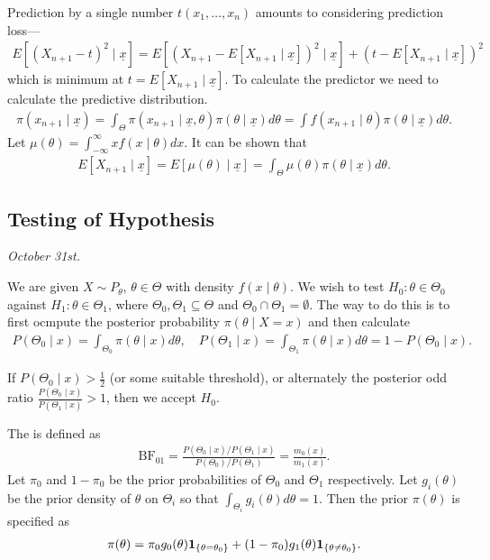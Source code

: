 Prediction by a single number $t(x_{1},\ldots,x_{n})$ amounts to considering prediction loss---
\begin{align}
    E[(X_{n+1}-t)^{2} \mid \underline{x}] = E[(X_{n+1}-E[X_{n+1} \mid \underline{x}])^{2} \mid \underline{x}] + (t-E[X_{n+1} \mid \underline{x}])^{2}
\end{align}
which is minimum at $t = E[X_{n+1} \mid \underline{x}]$. To calculate the predictor we need to calculate the predictive distribution.
\begin{align}
    \pi(x_{n+1} \mid \underline{x}) = \int_{\Theta} \pi(x_{n+1} \mid \underline{x},\theta) \pi(\theta \mid \underline{x}) d\theta = \int f(x_{n+1} \mid \theta) \pi(\theta \mid \underline{x}) d\theta.
\end{align}
Let $\mu(\theta) = \int_{-\infty}^{\infty} x f(x \mid \theta) dx$. It can be shown that
\begin{align}
    E[X_{n+1} \mid \underline{x}] = E[\mu(\theta) \mid \underline{x}] = \int_{\Theta} \mu(\theta) \pi(\theta \mid \underline{x}) d\theta.
\end{align}



\subsection{Testing of Hypothesis}

\textit{October 31st.}

We are given $X \sim P_{\theta}$, $\theta \in \Theta$ with density $f(x \mid \theta)$. We wish to test $H_{0}:\theta \in \Theta_{0}$ against $H_{1}:\theta \in \Theta_{1}$, where $\Theta_{0},\Theta_{1} \subseteq \Theta$ and $\Theta_{0} \cap \Theta_{1} = \emptyset$. The way to do this is to first ocmpute the posterior probability $\pi(\theta \mid X = x)$ and then calculate
\begin{align}
    P(\Theta_{0} \mid x) = \int_{\Theta_{0}} \pi(\theta \mid x) d\theta, \quad P(\Theta_{1} \mid x) = \int_{\Theta_{1}} \pi(\theta \mid x) d\theta = 1-P(\Theta_{0} \mid x).
\end{align}

If $P(\Theta_{0} \mid x) > \frac{1}{2}$ (or some suitable threshold), or alternately the posterior odd ratio $\frac{P(\Theta_{0} \mid x)}{P(\Theta_{1} \mid x)} > 1$, then we accept $H_{0}$.

The  is defined as
\begin{align}
    \mathrm{BF}_{01} = \frac{P(\Theta_{0} \mid x)/P(\Theta_{1} \mid x)}{P(\Theta_{0})/P(\Theta_{1})} = \frac{m_{0}(x)}{m_{1}(x)}.
\end{align}
Let $\pi_{0}$ and $1-\pi_{0}$ be the prior probabilities of $\Theta_{0}$ and $\Theta_{1}$ respectively. Let $g_{i}(\theta)$ be the prior density of $\theta$ on $\Theta_{i}$ so that $\int_{\Theta_{i}} g_{i}(\theta) d\theta = 1$. Then the prior $\pi(\theta)$ is specified as
\begin{align}
    \pi(\theta) = \pi_{0} g_{0}(\theta) \textbf{1}_{\{\theta = \theta_{0}\}} + (1-\pi_{0}) g_{1}(\theta) \textbf{1}_{\{\theta \neq \theta_{0}\}}.
\end{align}


